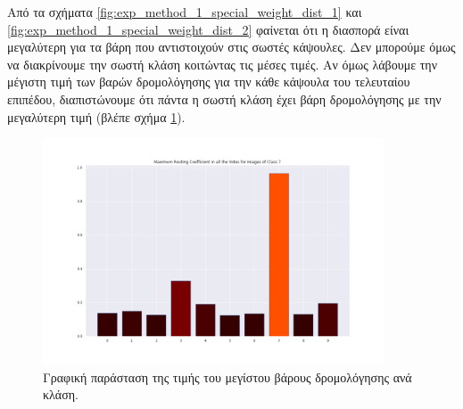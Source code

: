 Από τα σχήματα \ref{fig:exp_method_1_special_weight_dist_1} και \ref{fig:exp_method_1_special_weight_dist_2} φαίνεται ότι η διασπορά είναι μεγαλύτερη για τα βάρη που αντιστοιχούν στις σωστές κάψουλες. Δεν μπορούμε όμως να διακρίνουμε την σωστή κλάση κοιτώντας τις μέσες τιμές. Αν όμως λάβουμε την μέγιστη τιμή των βαρών δρομολόγησης για την κάθε κάψουλα του τελευταίου επιπέδου, διαπιστώνουμε ότι πάντα η σωστή κλάση έχει βάρη δρομολόγησης με την μεγαλύτερη τιμή (βλέπε σχήμα \ref{fig:exp_method_1_special_weight_dist_3}).
\begin{figure}[h]
    \centering
    \includegraphics[width=0.9\textwidth]{images/chapter experiments/method 1/image 13/Max_for_class_7.png}
    \caption{Γραφική παράσταση της τιμής του μεγίστου βάρους δρομολόγησης ανά κλάση.}
    \label{fig:exp_method_1_special_weight_dist_3}
  \end{figure}

